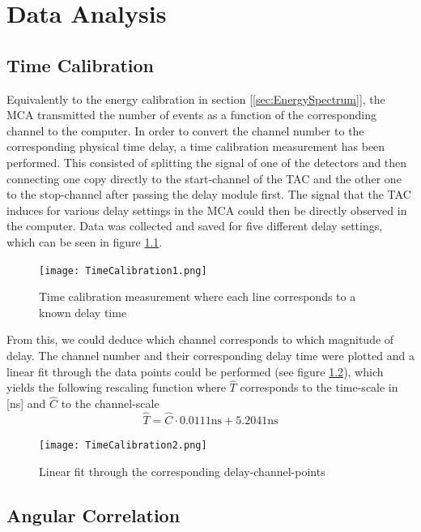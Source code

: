 \documentclass[a4paper,parskip,11pt, DIV12]{scrreprt}
\begin{document}
\chapter{Data Analysis}

\section{Time Calibration} \label{sec:TimeCal}

		Equivalently to the energy calibration in section [\ref{sec:EnergySpectrum}], the MCA transmitted the number of events as a function of the corresponding channel to the computer. In order to convert the channel number to the corresponding physical time delay, a time calibration measurement has been performed. This consisted of splitting the signal of one of the detectors and then connecting one copy directly to the start-channel of the TAC and the other one to the stop-channel after passing the delay module first. The signal that the TAC induces for various delay settings in the MCA could then be directly observed in the computer. Data was collected and saved for five different delay settings, which can be seen in figure \ref{fig:TimeCal1}.
		\begin{figure}[H]
\centering
\texttt{[image: TimeCalibration1.png]}
\caption[TimeCalibration1]{Time calibration measurement where each line corresponds to a known delay time}
\label{fig:TimeCal1}
	\end{figure}
	From this, we could deduce which channel corresponds to which magnitude of delay. The channel number and their corresponding delay time were plotted and a linear fit through the data points could be performed (see figure \ref{fig:TimeCal2}), which yields the following rescaling function where $\hat{T}$ corresponds to the time-scale in [ns] and $\hat{C}$ to the channel-scale
	\begin{equation}
	\hat{T} = \hat{C} \cdot 0.0111 \mathrm{ns} + 5.2041 \mathrm{ns} 
	\end{equation}
	\begin{figure}[H]
\centering
\texttt{[image: TimeCalibration2.png]}
\caption[TimeCalibration2]{Linear fit through the corresponding delay-channel-points}
\label{fig:TimeCal2}
	\end{figure}

\section{Angular Correlation}
\end{document}
